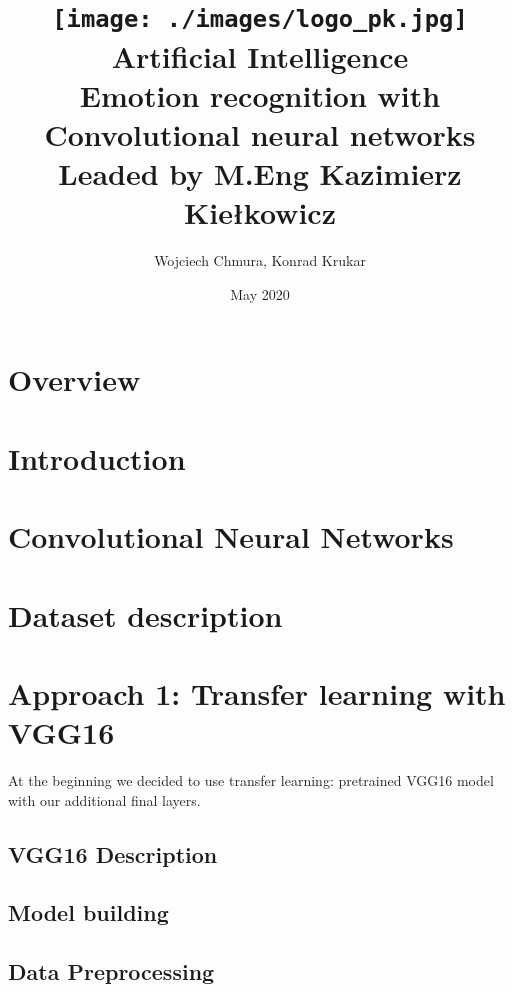 \documentclass{article}
\title{
    {\texttt{[image: ./images/logo\_pk.jpg]}}\\
    {Artificial Intelligence}\\
    {\large Emotion recognition with Convolutional neural networks}\\
     \small Leaded by M.Eng Kazimierz Kiełkowicz
    }
\author{Wojciech Chmura, Konrad Krukar}
\date{May 2020}
\begin{document}
    \maketitle
    \newpage
    \tableofcontents
    \newpage
    
    \section{Overview}
    
    
    \section{Introduction}
        
    
    \newpage
    \section{Convolutional Neural Networks}
        
    
    \newpage
    \section{Dataset description}
    
    
    \newpage
    \section{Approach 1: Transfer learning with VGG16}
    At the beginning we decided to use transfer learning: pretrained VGG16 model with our additional final layers.
 
    	\subsection{VGG16 Description}
    	
    	
    	\newpage
    	\subsection{Model building}
    	
    
    	\newpage
    	\subsection{Data Preprocessing}
    	
    	
\end{document}

